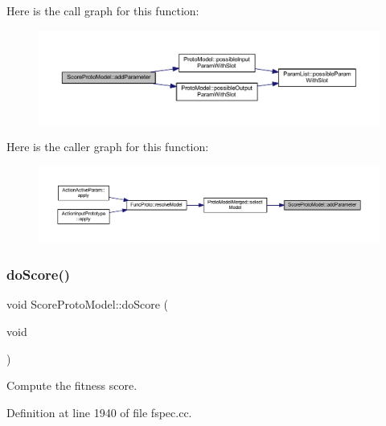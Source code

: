 Here is the call graph for this function\+:
\nopagebreak
\begin{figure}[H]
\begin{center}
\leavevmode
\includegraphics[width=350pt]{class_score_proto_model_aac1568db9b3ebba5747ad8eba5f6438f_cgraph}
\end{center}
\end{figure}
Here is the caller graph for this function\+:
\nopagebreak
\begin{figure}[H]
\begin{center}
\leavevmode
\includegraphics[width=350pt]{class_score_proto_model_aac1568db9b3ebba5747ad8eba5f6438f_icgraph}
\end{center}
\end{figure}
\mbox{\label{class_score_proto_model_aae328b10f50c1f6526f503e0064d4749}} 
\subsubsection{\texorpdfstring{doScore()}{doScore()}}
{\footnotesize\ttfamily void Score\+Proto\+Model\+::do\+Score (\begin{DoxyParamCaption}\item[{void}]{ }\end{DoxyParamCaption})}



Compute the fitness score. 



Definition at line 1940 of file fspec.\+cc.

